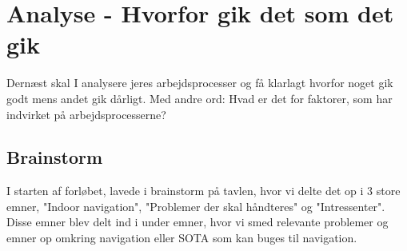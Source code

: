 \documentclass[a4paper,12pt, article]{memoir}
\begin{document}
    

    \section{Analyse - Hvorfor gik det som det gik}
    Dernæst skal I analysere jeres arbejdsprocesser og få klarlagt hvorfor noget gik godt mens andet gik dårligt. Med andre ord: Hvad er det for faktorer, som har indvirket på arbejdsprocesserne? 

    

        \subsection{Brainstorm}
        I starten af forløbet, lavede i brainstorm på tavlen, hvor vi delte det op i 3 store  emner, "Indoor navigation", "Problemer der skal håndteres" og "Intressenter". Disse emner blev delt ind i under emner, hvor vi smed relevante problemer og emner op omkring navigation eller SOTA som kan buges til navigation. 
\end{document}
